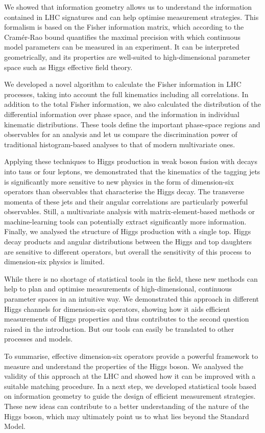 We showed that information geometry allows us to understand the
information contained in LHC signatures and can help optimise
measurement strategies. This formalism is based on the Fisher
information matrix, which according to the Cram\'er-Rao bound
quantifies the maximal precision with which continuous model
parameters can be measured in an experiment. It can be interpreted
geometrically, and its properties are well-suited to high-dimensional
parameter space such as Higgs effective field theory.

We developed a novel algorithm to calculate the Fisher information in
LHC processes, taking into account the full kinematics including all
correlations. In addition to the total Fisher information, we also
calculated the distribution of the differential information over phase
space, and the information in individual kinematic
distributions. These tools define the important phase-space regions
and observables for an analysis and let us compare the discrimination
power of traditional histogram-based analyses to that of modern
multivariate ones.

Applying these techniques to Higgs production in weak boson fusion
with decays into taus or four leptons, we demonstrated that the
kinematics of the tagging jets is significantly more sensitive to new
physics in the form of dimension-six operators than observables that
characterise the Higgs decay.  The transverse momenta of these jets
and their angular correlations are particularly powerful
observables. Still, a multivariate analysis with matrix-element-based
methods or machine-learning tools can potentially extract
significantly more information. Finally, we analysed the structure of
Higgs production with a single top. Higgs decay products and angular
distributions between the Higgs and top daughters are sensitive to
different operators, but overall the sensitivity of this process to
dimension-six physics is limited.

%
While there is no shortage of statistical tools in the field, these
new methods can help to plan and optimise measurements of
high-dimensional, continuous parameter spaces in an intuitive way.  We
demonstrated this approach in different Higgs channels for
dimension-six operators, showing how it aids efficient measurements of
Higgs properties and thus contributes to the second question raised in
the introduction. But our tools can easily be translated to other
processes and models.

\newparagraph
%
To summarise, effective dimension-six operators provide a powerful
framework to measure and understand the properties of the Higgs
boson. We analysed the validity of this approach at the LHC and showed
how it can be improved with a suitable matching procedure. In a next
step, we developed statistical tools based on information geometry to
guide the design of efficient measurement strategies. These new ideas
can contribute to a better understanding of the nature of the Higgs
boson, which may ultimately point us to what lies beyond the Standard
Model.
